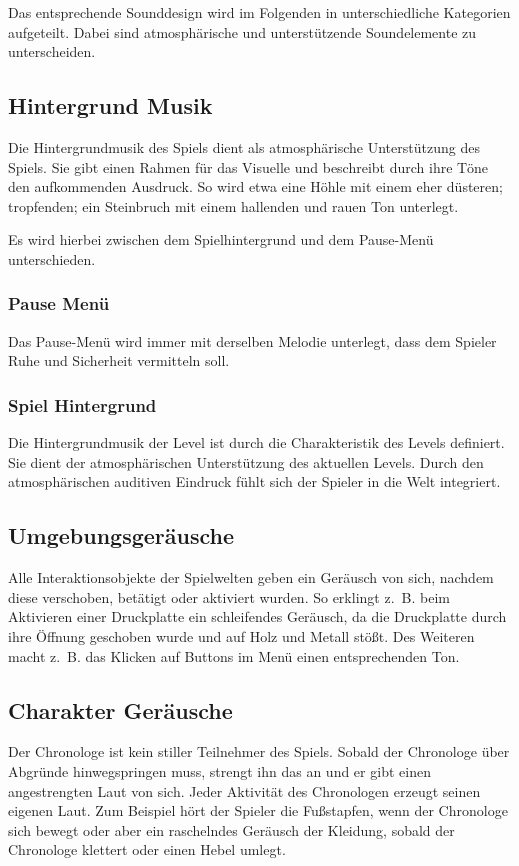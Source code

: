 Das entsprechende Sounddesign wird im Folgenden in unterschiedliche Kategorien aufgeteilt. Dabei sind atmosphärische und unterstützende Soundelemente zu unterscheiden.

\subsection{Hintergrund Musik}
Die Hintergrundmusik des Spiels dient als atmosphärische Unterstützung des Spiels. Sie gibt einen Rahmen für das Visuelle und beschreibt durch ihre Töne den aufkommenden Ausdruck. So wird etwa eine Höhle mit einem eher düsteren; tropfenden; ein Steinbruch mit einem hallenden und rauen Ton unterlegt.

Es wird hierbei zwischen dem Spielhintergrund und dem Pause-Menü unterschieden.

\subsubsection{Pause Menü}
Das Pause-Menü wird immer mit derselben Melodie unterlegt, dass dem Spieler Ruhe und Sicherheit vermitteln soll. 

\subsubsection{Spiel Hintergrund}
Die Hintergrundmusik der Level ist durch die Charakteristik des Levels definiert. Sie dient der atmosphärischen Unterstützung des aktuellen Levels. Durch den atmosphärischen auditiven Eindruck fühlt sich der Spieler in die Welt integriert.

\subsection{Umgebungsgeräusche}
Alle Interaktionsobjekte der Spielwelten geben ein Geräusch von sich, nachdem diese verschoben, betätigt oder aktiviert wurden. So erklingt z. B. beim Aktivieren einer Druckplatte ein schleifendes Geräusch, da die Druckplatte durch ihre Öffnung geschoben wurde und auf Holz und Metall stößt. Des Weiteren macht z. B. das Klicken auf Buttons im Menü einen entsprechenden Ton.

\subsection{Charakter Geräusche}
Der Chronologe ist kein stiller Teilnehmer des Spiels. Sobald der Chronologe über Abgründe hinwegspringen muss, strengt ihn das an und er gibt einen angestrengten Laut von sich. Jeder Aktivität des Chronologen erzeugt seinen eigenen Laut. Zum Beispiel hört der Spieler die Fußstapfen, wenn der Chronologe sich bewegt oder aber ein raschelndes Geräusch der Kleidung, sobald der Chronologe klettert oder einen Hebel umlegt.

